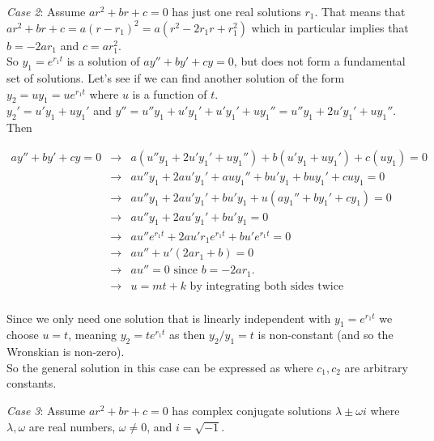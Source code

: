\documentclass{ximera}
\begin{document}
\newpage



\emph{Case 2}:  Assume $ar^2+br +c=0$ has just one real solutions $r_1$.  That means that \\$ar^2+br +c=a(r-r_1)^2=a(r^2-2r_1 r+r_1^2)$ which in particular implies that $b=-2ar_1$ and $c=ar_1^2$. \\


 So $y_1=e^{r_1 t}$ is a solution of $ay''+by'+cy=0$, but does not form a fundamental set of solutions.  Let's see if we can find another solution of the form $y_2=uy_1=ue^{r_1 t}$ where $u$ is a function of $t$.\\

 $y_2'=u' y_1+uy_1'$ and $y''=u''y_1+u'y_1'+u'y_1'+uy_1''=u''y_1+2u'y_1'+uy_1''$.\\

Then

 \begin{eqnarray*}
  ay''+by'+cy=0 &\rightarrow & a(u''y_1+2u'y_1'+uy_1'')+b(u' y_1+uy_1')+c(uy_1)=0 \\
   &\rightarrow & au''y_1+2au'y_1'+auy_1''+bu' y_1+buy_1'+cuy_1=0 \\
   &\rightarrow & au''y_1+2au'y_1'+bu' y_1+u\left(ay_1''+by_1'+cy_1\right)=0 \\
   &\rightarrow & au''y_1+2au'y_1'+bu' y_1=0 \\
   &\rightarrow & au''e^{r_1 t}+2au' r_1e^{r_1 t}+bu' e^{r_1 t}=0 \\
   &\rightarrow & au''+u'(2ar_1+b) =0 \\
   &\rightarrow & au''=0\mbox{ since }b=-2ar_1.\\
   &\rightarrow & u=m t+k\mbox{ by integrating both sides twice}\\
 \end{eqnarray*}

 Since we only need one solution that is linearly independent with $y_1=e^{r_1 t}$ we choose $u=t$, meaning $y_2=te^{r_1 t}$ as then $y_2/y_1=t$ is non-constant (and so the Wronskian is non-zero).\\

 So the general solution in this case can be expressed as  where $c_1,c_2$ are arbitrary constants.


\emph{Case 3}: Assume $ar^2+br +c=0$ has complex conjugate solutions $\lambda \pm \omega i$ where $\lambda,\omega$ are real numbers, $\omega\neq 0$, and $i=\sqrt{-1}$.\\
\end{document}
